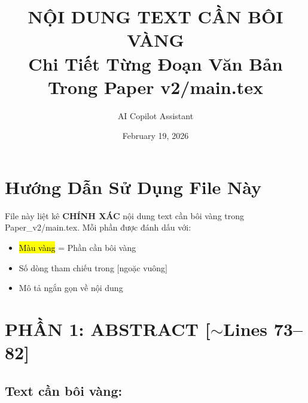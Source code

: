\documentclass[11pt,a4paper]{article}
\title{\textbf{NỘI DUNG TEXT CẦN BÔI VÀNG}\\[0.5em]
\large Chi Tiết Từng Đoạn Văn Bản Trong Paper v2/main.tex}
\author{AI Copilot Assistant}
\date{February 19, 2026}
\begin{document}
\maketitle

\section*{Hướng Dẫn Sử Dụng File Này}

File này liệt kê \textbf{CHÍNH XÁC} nội dung text cần bôi vàng trong Paper\_v2/main.tex. 
Mỗi phần được đánh dấu với:
\begin{itemize}
    \item \hl{Màu vàng} = Phần cần bôi vàng
    \item Số dòng tham chiếu trong $[$ngoặc vuông$]$
    \item Mô tả ngắn gọn về nội dung
\end{itemize}

\vspace{1em}
\begin{center}
\end{center}

\newpage
\section{PHẦN 1: ABSTRACT [$\sim$Lines 73--82]}

\subsection*{Text cần bôi vàng:}
\end{document}
